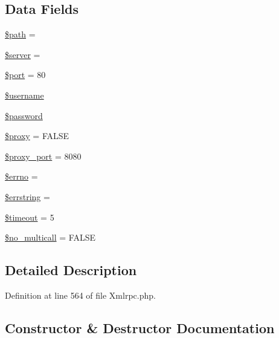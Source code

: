 \subsection*{Data Fields}
\begin{DoxyCompactItemize}
\item 
\mbox{\hyperlink{class_x_m_l___r_p_c___client_a0a4baf0b22973c07685c3981f0d17fc4}{\$path}} = \textquotesingle{}\textquotesingle{}
\item 
\mbox{\hyperlink{class_x_m_l___r_p_c___client_ad135cc8a47e55f0829949cf62214170f}{\$server}} = \textquotesingle{}\textquotesingle{}
\item 
\mbox{\hyperlink{class_x_m_l___r_p_c___client_aa0787efab4b22e8a212882f3409d4c77}{\$port}} = 80
\item 
\mbox{\hyperlink{class_x_m_l___r_p_c___client_a0eb82aa5f81cf845de4b36cd653c42cf}{\$username}}
\item 
\mbox{\hyperlink{class_x_m_l___r_p_c___client_a607686ef9f99ea7c42f4f3dd3dbb2b0d}{\$password}}
\item 
\mbox{\hyperlink{class_x_m_l___r_p_c___client_a01564a63e754b8037a987f7f8fde0e6d}{\$proxy}} = F\+A\+L\+SE
\item 
\mbox{\hyperlink{class_x_m_l___r_p_c___client_a778054bf2337c6516bdad84294329511}{\$proxy\+\_\+port}} = 8080
\item 
\mbox{\hyperlink{class_x_m_l___r_p_c___client_a2be10a914e39a6b1f855ddf3b9a21367}{\$errno}} = \textquotesingle{}\textquotesingle{}
\item 
\mbox{\hyperlink{class_x_m_l___r_p_c___client_ac0e00fea1b952868a67648a9442a58da}{\$errstring}} = \textquotesingle{}\textquotesingle{}
\item 
\mbox{\hyperlink{class_x_m_l___r_p_c___client_a84320a9bf3e591d7ae20dfcb0dfe6a0d}{\$timeout}} = 5
\item 
\mbox{\hyperlink{class_x_m_l___r_p_c___client_a77b58d3e00e1054158dc707e34334497}{\$no\+\_\+multicall}} = F\+A\+L\+SE
\end{DoxyCompactItemize}


\subsection{Detailed Description}


Definition at line 564 of file Xmlrpc.\+php.



\subsection{Constructor \& Destructor Documentation}
\mbox{\label{class_x_m_l___r_p_c___client_ab665c9b62c100416c6c1e20ec650f553}} 

